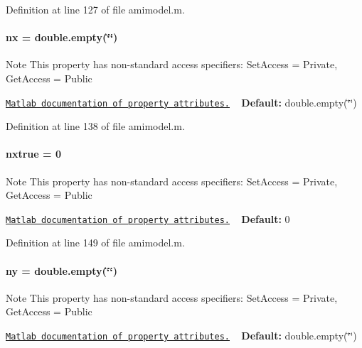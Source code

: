 Definition at line 127 of file amimodel.\+m.

\hypertarget{classamimodel_a84e4236f07668a770c27567f1f9615ff}{}
\paragraph[{nx}]{\setlength{\rightskip}{0pt plus 5cm}nx = double.\+empty(\char`\"{}\char`\"{})}\label{classamimodel_a84e4236f07668a770c27567f1f9615ff}
\begin{DoxyNote}{Note}
This property has non-\/standard access specifiers\+: {\ttfamily Set\+Access = Private, Get\+Access = Public} 

\href{http://www.mathworks.com/help/matlab/matlab_oop/property-attributes.html}{\tt Matlab documentation of property attributes.} ~\newline
{\bfseries Default\+:} double.\+empty(\char`\"{}\char`\"{}) 
\end{DoxyNote}


Definition at line 138 of file amimodel.\+m.

\hypertarget{classamimodel_a49c476de14a021114feb8c95da04952a}{}
\paragraph[{nxtrue}]{\setlength{\rightskip}{0pt plus 5cm}nxtrue = 0}\label{classamimodel_a49c476de14a021114feb8c95da04952a}
\begin{DoxyNote}{Note}
This property has non-\/standard access specifiers\+: {\ttfamily Set\+Access = Private, Get\+Access = Public} 

\href{http://www.mathworks.com/help/matlab/matlab_oop/property-attributes.html}{\tt Matlab documentation of property attributes.} ~\newline
{\bfseries Default\+:} 0 
\end{DoxyNote}


Definition at line 149 of file amimodel.\+m.

\hypertarget{classamimodel_a289ca425eb368f1d582b6be2be0d3dfc}{}
\paragraph[{ny}]{\setlength{\rightskip}{0pt plus 5cm}ny = double.\+empty(\char`\"{}\char`\"{})}\label{classamimodel_a289ca425eb368f1d582b6be2be0d3dfc}
\begin{DoxyNote}{Note}
This property has non-\/standard access specifiers\+: {\ttfamily Set\+Access = Private, Get\+Access = Public} 

\href{http://www.mathworks.com/help/matlab/matlab_oop/property-attributes.html}{\tt Matlab documentation of property attributes.} ~\newline
{\bfseries Default\+:} double.\+empty(\char`\"{}\char`\"{}) 
\end{DoxyNote}


